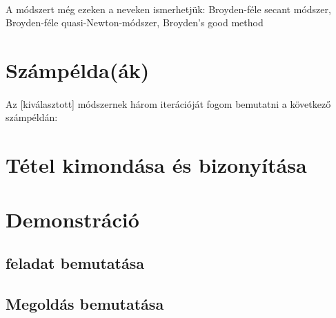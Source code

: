 \documentclass[11pt,twoside,a4pape,draftr]{article}
\begin{document}
			\paragraph{}
				A módszert még ezeken a neveken ismerhetjük: Broyden-féle secant módszer,  Broyden-féle quasi-Newton-módszer,  Broyden's good method
	\section{Számpélda(ák)}
		\paragraph{}
			Az [kiválasztott] módszernek három iterációját fogom bemutatni a következő számpéldán:
	\section{Tétel kimondása és bizonyítása}
	\section{Demonstráció}
		\subsection{feladat bemutatása}
		\subsection{Megoldás bemutatása}
\end{document}
